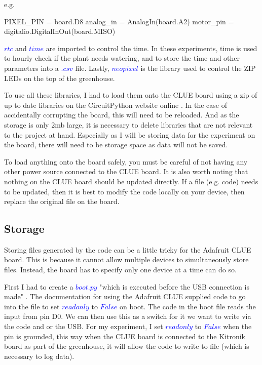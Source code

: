 e.g.
\begin{python}
    PIXEL_PIN = board.D8 
    analog_in = AnalogIn(board.A2)
    motor_pin = digitalio.DigitalInOut(board.MISO)
\end{python}

\textcolor{blue}{$rtc$} and \textcolor{blue}{$time$} are imported to control the time. In these experiments, time is used to hourly check if the plant needs watering, and to store the time and other parameters into a \textcolor{blue}{$.csv$} file. Lastly, \textcolor{blue}{$neopixel$} is the library used to control the ZIP LEDs on the top of the greenhouse.

To use all these libraries, I had to load them onto the CLUE board using a zip of up to date libraries on the CircuitPython website online \cite{circuitpython}. In the case of accidentally corrupting the board, this will need to be reloaded. And as the storage is only 2mb large, it is necessary to delete libraries that are not relevant to the project at hand. Especially as I will be storing data for the experiment on the board, there will need to be storage space as data will not be saved.

To load anything onto the board safely, you must be careful of not having any other power source connected to the CLUE board. It is also worth noting that nothing on the CLUE board should be updated directly. If a file (e.g. code) needs to be updated, then it is best to modify the code locally on your device, then replace the original file on the board.

\subsection{Storage}

Storing files generated by the code can be a little tricky for the Adafruit CLUE board. This is because it cannot allow multiple devices to simultaneously store files. Instead, the board has to specify only one device at a time can do so. 

First I had to create a \textcolor{blue}{$boot.py$} "which is executed before the USB connection is made" \cite{learnAdafruit}. The documentation for using the Adafruit CLUE supplied code to go into the file to set \textcolor{blue}{$readonly$} to \textcolor{blue}{$False$} on boot. The code in the boot file reads the input from pin D0. We can then use this as a switch for it we want to write via the code and or the USB. For my experiment, I set \textcolor{blue}{$readonly$} to \textcolor{blue}{$False$} when the pin is grounded, this way when the CLUE board is connected to the Kitronik board as part of the greenhouse, it will allow the code to write to file (which is necessary to log data).

